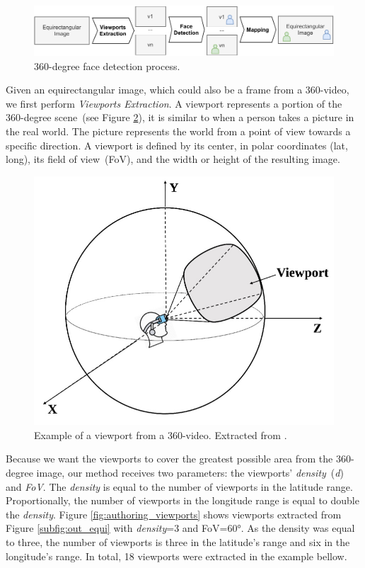 \begin{figure}[!ht]
    \centering
    \includegraphics[width=1\linewidth]{img/video360/360facedetection.pdf}
    \caption{360-degree face detection process.}
    \label{fig:360_face_detection}
\end{figure}

Given an equirectangular image, which could also be a frame from a 360-video, we first perform \emph{Viewports Extraction}. A viewport represents a portion of the 360-degree scene~(see Figure \ref{fig:authoring_exviewport}), it is similar to when a person takes a picture in the real world. The picture represents the world from a point of view towards a specific direction. A viewport is defined by its center, in polar coordinates (lat, long), its field of view~(FoV), and the width or height of the resulting image.

\begin{figure}[!ht]
    \centering
    \includegraphics[width=0.5\linewidth]{img/video360/viewport.jpg}
    \caption{Example of a viewport from a 360-video. Extracted from \cite{nguyen2020evaluation}.}
    \label{fig:authoring_exviewport}
\end{figure}

Because we want the viewports to cover the greatest possible area from the 360-degree image, our method receives two parameters: the viewports' \emph{density}~(\emph{d}) and \emph{FoV}. The \emph{density} is equal to the number of viewports in the latitude range. Proportionally, the number of viewports in the longitude range is equal to double the \emph{density}. Figure \ref{fig:authoring_viewports} shows viewports extracted from Figure \ref{subfig:out_equi} with \emph{density}=3 and FoV=60°. As the density was equal to three, the number of viewports is three in the latitude's range and six in the longitude's range. In total, 18 viewports were extracted in the example bellow.

